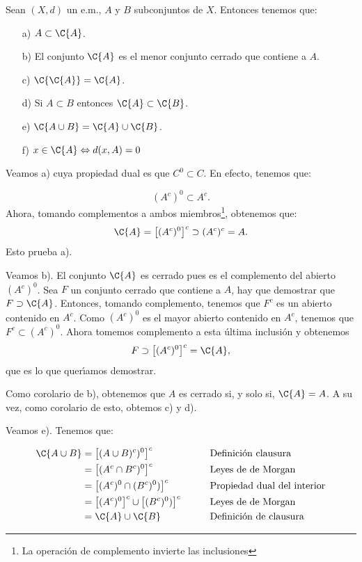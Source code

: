 \begin{teorema} Sean $(X,d)$ un e.m., $A$ y $B$ subconjuntos de
$X$. Entonces tenemos que:
\begin{itemize}
\item[a)] $A\subset \C{A}$.
\item[b)] El conjunto $\C{A}$ es el menor conjunto cerrado que
contiene a $A$.
\item[c)] $\C{\C{A}}=\C{A}$.
\item[d)] Si $A\subset B$ entonces $\C{A}\subset \C{B}$.
\item[e)]$\C{A\cup B}=\C{A}\cup \C{B}$.
\item[f)]$x\in \C{A}\Leftrightarrow d(x,A)=0$
\end{itemize}
\end{teorema}
\begin{demo} Veamos a) cuya propiedad dual es que $C^0\subset C$.
En efecto, tenemos que:

\[(A^c)^0\subset A^c.\]
Ahora, tomando complementos a ambos miembros\footnote{La
operaci\'on de complemento invierte las inclusiones}, obtenemos
que:
\[\C{A}=\bigl[(A^c)^0\bigr]^c\supset (A^c)^c=A.\]
Esto prueba a).

Veamos b). El conjunto $\C{A}$ es cerrado pues es el complemento
del abierto $(A^c)^0$. Sea $F$ un conjunto cerrado que contiene a
$A$, hay que demostrar que $F\supset \C{A}$. Entonces, tomando
complemento, tenemos que $F^c$ es un abierto contenido en $A^c$.
Como $(A^c)^0$ es el mayor abierto contenido en $A^c$, tenemos que
$F^c\subset (A^c)^0$. Ahora tomemos complemento a esta \'ultima
inclusi\'on y obtenemos
\[F\supset \bigl[(A^c)^0\bigr]^c=\C{A},\]
que es lo que quer\'{\i}amos demostrar.

Como corolario de b), obtenemos que  $A$ es cerrado si, y solo si,
$\C{A}=A$. A su vez, como corolario de esto, obtemos c) y d).

Veamos e). Tenemos que:

\begin{align}
  \C{A\cup B}&=\bigl[(A\cup B)^c)^0\bigr]^c         &\qquad &\text{Definici\'on clausura}\notag \\
			 &=\bigl[(A^c\cap B^c)^0\bigr]^c    &&\text{Leyes de de         Morgan}\notag\\
			 &=\bigl[(A^c)^0\cap (B^c)^0)\bigr]^c &&\text{Propiedad dual del interior}\notag\\
			 &=\bigl[(A^c)^0\bigr]^c\cup \bigl[(B^c)^0)\bigr]^c &&\text{Leyes de de Morgan}\notag\\
			 &= \C{A}\cup \C{B}                     &&\text{Definici\'on de
			 clausura}\notag
  \end{align}



\end{demo}
